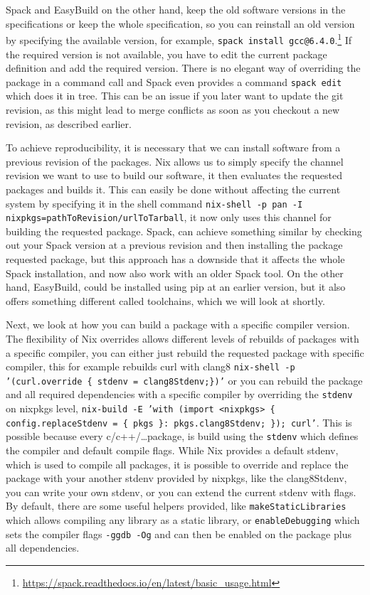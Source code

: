 \documentclass[conference,final,a4paper]{IEEEtran}
\begin{document}
Spack and EasyBuild on the other hand, keep the old software versions in the specifications or keep the whole specification, so you can reinstall an old version by specifying the available version, for example, \texttt{spack install gcc@6.4.0}.\footnote{\url{https://spack.readthedocs.io/en/latest/basic_usage.html}}
If the required version is not available, you have to edit the current package definition and add the required version.
There is no elegant way of overriding the package in a command call and Spack even provides a command \texttt{spack edit} which does it in tree.
This can be an issue if you later want to update the git revision, as this might lead to merge conflicts as soon as you checkout a new revision, as described earlier.

To achieve reproducibility, it is necessary that we can install software from a previous revision of the packages.
Nix allows us to simply specify the channel revision we want to use to build our software, it then evaluates the requested packages and builds it.
This can easily be done without affecting the current system by specifying it in the shell command \texttt{nix-shell -p pan -I nixpkgs=pathToRevision/urlToTarball}, it now only uses this channel for building the requested package.
Spack, can achieve something similar by checking out your Spack version at a previous revision and then installing the package requested package, but this approach has a downside that it affects the whole Spack installation, and now also work with an older Spack tool.
On the other hand, EasyBuild, could be installed using pip at an earlier version, but it also offers something different called toolchains, which we will look at shortly.

Next, we look at how you can build a package with a specific compiler version.
The flexibility of Nix overrides allows different levels of rebuilds of packages with a specific compiler, you can either just rebuild the requested package with specific compiler, this for example rebuilds curl with clang8 \texttt{nix-shell -p '(curl.override \{ stdenv = clang8Stdenv;\})'} or you can rebuild the package and all required dependencies with a specific compiler by overriding the \texttt{stdenv} on nixpkgs level, \texttt{nix-build -E 'with (import <nixpkgs> \{ config.replaceStdenv = \{ pkgs \}: pkgs.clang8Stdenv; \}); curl'}.
This is possible because every c/c++/\ldots package, is build using the \texttt{stdenv} which defines the compiler and default compile flags.
While Nix provides a default stdenv, which is used to compile all packages, it is possible to override and replace the package with your another stdenv provided by nixpkgs, like the clang8Stdenv, you can write your own stdenv, or you can extend the current stdenv with flags.
By default, there are some useful helpers provided, like \texttt{makeStaticLibraries} which allows compiling any library as a static library, or \texttt{enableDebugging} which sets the compiler flags \texttt{-ggdb -Og} and can then be enabled on the package plus all dependencies.
\end{document}
